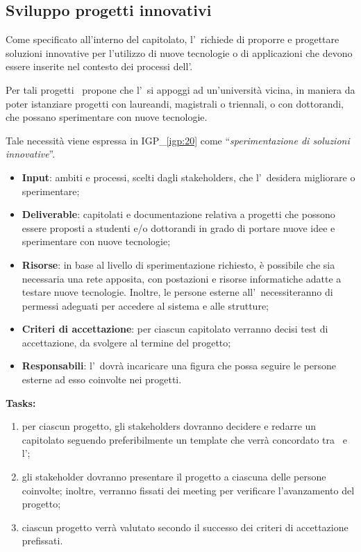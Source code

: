 	\subsection{Sviluppo progetti innovativi}
	
		Come specificato all'interno del capitolato, l'\istituto~richiede di proporre e progettare soluzioni innovative per l’utilizzo di nuove tecnologie o di applicazioni che devono essere inserite nel contesto dei processi dell'\istituto.
		
		Per tali progetti \azienda~propone che l'\istituto~si appoggi ad un'università vicina, in maniera da poter istanziare progetti con laureandi, magistrali o triennali, o con dottorandi, che possano sperimentare con nuove tecnologie.
		
		Tale necessità viene espressa in {\color{pantone}IGP\_\ref{igp:20}} come ``\textit{sperimentazione di soluzioni innovative}''.
	
		\begin{itemize}[noitemsep]
			\renewcommand\labelitemi{--}
			\item \textbf{Input}: ambiti e processi, scelti dagli stakeholders, che l'\istituto~desidera migliorare o sperimentare;
			\item \textbf{Deliverable}: capitolati e documentazione relativa a progetti che possono essere proposti a studenti e/o dottorandi in grado di portare nuove idee e sperimentare con nuove tecnologie;
			\item \textbf{Risorse}: in base al livello di sperimentazione richiesto, è possibile che sia necessaria una rete apposita, con postazioni e risorse informatiche adatte a testare nuove tecnologie.
			Inoltre, le persone esterne all'\istituto~necessiteranno di permessi adeguati per accedere al sistema e alle strutture;
			\item \textbf{Criteri di accettazione}: per ciascun capitolato verranno decisi test di accettazione, da svolgere al termine del progetto;
			\item \textbf{Responsabili}: l'\istituto~dovrà incaricare una figura che possa seguire le persone esterne ad esso coinvolte nei progetti.
		\end{itemize}
		
		\textbf{Tasks:}
		\begin{enumerate}[noitemsep]
			\item per ciascun progetto, gli stakeholders dovranno decidere e redarre un capitolato seguendo preferibilmente un template che verrà concordato tra \azienda~e l'\istituto;
			\item gli stakeholder dovranno presentare il progetto a ciascuna delle persone coinvolte; inoltre, verranno fissati dei meeting per verificare l'avanzamento del progetto;
			\item ciascun progetto verrà valutato secondo il successo dei criteri di accettazione prefissati.
		\end{enumerate}
	
